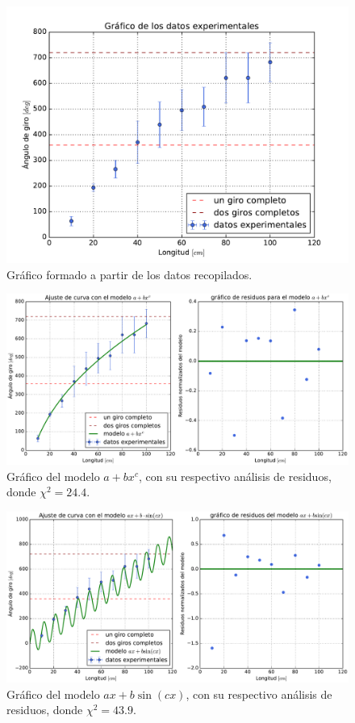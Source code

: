 \documentclass[11pt]{article}
\begin{document}
\begin{figure}[ht]
    \centering
    \includegraphics[scale=0.5]{Informe/img/grafico-datos.pdf}
    \caption{Gráfico formado a partir de los datos recopilados.}
    \label{fig:datos}
\end{figure}

\begin{figure}[ht]
    \centering
    \includegraphics[scale=0.5]{Informe/img/grafico-modelo-axb.pdf}
    \caption{Gráfico del modelo $a + bx^{c}$, con su respectivo análisis de residuos, donde $\chi^2 = 24.4$.}
    \label{fig:axb}
\end{figure}

\begin{figure}[ht]
    \centering
    \includegraphics[scale=0.5]{Informe/img/grafico-modelo-asinb.pdf}
    \caption{Gráfico del modelo $ax + b\sin(cx)$, con su respectivo análisis de residuos, donde $\chi^2 = 43.9$.}
    \label{fig:asinb}
\end{figure}
\end{document}

